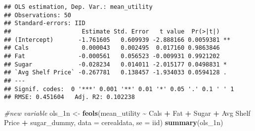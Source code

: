 \documentclass[
]{article}
\newenvironment{Shaded}{\begin{snugshade}}{\end{snugshade}}
\newcommand{\AttributeTok}[1]{\textcolor[rgb]{0.13,0.29,0.53}{#1}}
\newcommand{\CommentTok}[1]{\textcolor[rgb]{0.56,0.35,0.01}{\textit{#1}}}
\newcommand{\DecValTok}[1]{\textcolor[rgb]{0.00,0.00,0.81}{#1}}
\newcommand{\FunctionTok}[1]{\textcolor[rgb]{0.13,0.29,0.53}{\textbf{#1}}}
\newcommand{\NormalTok}[1]{#1}
\newcommand{\OtherTok}[1]{\textcolor[rgb]{0.56,0.35,0.01}{#1}}
\newcommand{\SpecialCharTok}[1]{\textcolor[rgb]{0.81,0.36,0.00}{\textbf{#1}}}
\newcommand{\StringTok}[1]{\textcolor[rgb]{0.31,0.60,0.02}{#1}}
\begin{document}
\begin{Shaded}
\end{Shaded}

\begin{verbatim}
## OLS estimation, Dep. Var.: mean_utility
## Observations: 50
## Standard-errors: IID 
##                    Estimate Std. Error   t value  Pr(>|t|)    
## (Intercept)       -1.761605   0.609939 -2.888166 0.0059381 ** 
## Cals               0.000043   0.002495  0.017160 0.9863846    
## Fat               -0.000561   0.056523 -0.009931 0.9921202    
## Sugar             -0.028234   0.014011 -2.015177 0.0498831 *  
## `Avg Shelf Price` -0.267781   0.138457 -1.934033 0.0594128 .  
## ---
## Signif. codes:  0 '***' 0.001 '**' 0.01 '*' 0.05 '.' 0.1 ' ' 1
## RMSE: 0.451604   Adj. R2: 0.102238
\end{verbatim}

\begin{Shaded}
\begin{Highlighting}[]
\CommentTok{\#new variable}
\NormalTok{ols\_1n }\OtherTok{\textless{}{-}} \FunctionTok{feols}\NormalTok{(mean\_utility }\SpecialCharTok{\textasciitilde{}}\NormalTok{ Cals }\SpecialCharTok{+}\NormalTok{ Fat }\SpecialCharTok{+}\NormalTok{ Sugar }\SpecialCharTok{+} \StringTok{\textasciigrave{}}\AttributeTok{Avg Shelf Price}\StringTok{\textasciigrave{}} \SpecialCharTok{+}\NormalTok{ sugar\_dummy, }\AttributeTok{data =}\NormalTok{ cerealdata,}
                \AttributeTok{se =} \StringTok{\textquotesingle{}iid\textquotesingle{}}\NormalTok{)}
\FunctionTok{summary}\NormalTok{(ols\_1n)}
\end{Highlighting}
\end{Shaded}
\end{document}
